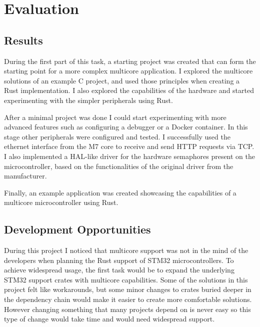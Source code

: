 \chapter{Evaluation}

\section{Results}

During the first part of this task, a starting project was created that can form the starting point for a more complex multicore application. I explored the multicore solutions of an example C project, and used those principles when creating a Rust implementation. I also explored the capabilities of the hardware and started experimenting with the simpler peripherals using Rust.

After a minimal project was done I could start experimenting with more advanced features such as configuring a debugger or a Docker container. In this stage other peripherals were configured and tested. I successfully used the ethernet interface from the M7 core to receive and send HTTP requests via TCP. I also implemented a HAL-like driver for the hardware semaphores present on the microcontroller, based on the functionalities of the original driver from the manufacturer.

Finally, an example application was created showcasing the capabilities of a multicore microcontroller using Rust.

\section{Development Opportunities}

During this project I noticed that multicore support was not in the mind of the developers when planning the Rust support of STM32 microcontrollers. To achieve widespread usage, the first task would be to expand the underlying STM32 support crates with multicore capabilities. Some of the solutions in this project felt like workarounds, but some minor changes to crates buried deeper in the dependency chain would make it easier to create more comfortable solutions. However changing something that many projects depend on is never easy so this type of change would take time and would need widespread support.
